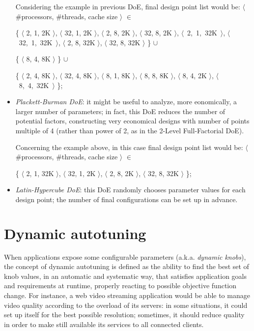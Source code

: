 \begin{itemize}
\begin{enumerate}
    \end{enumerate}
    
    Considering the example in previous DoE, final design point list would be: $\langle$ \#processors, \#threads, cache size $\rangle$ $\in$
    
    \{ $\langle$ 2, 1, 2K $\rangle$, $\langle$ 32, 1, 2K $\rangle$, $\langle$ 2, 8, 2K $\rangle$, $\langle$ 32, 8, 2K $\rangle$, \hbox{$\langle$ 2, 1, 32K $\rangle$}, \hbox{$\langle$ 32, 1, 32K $\rangle$}, $\langle$ 2, 8, 32K $\rangle$, $\langle$ 32, 8, 32K $\rangle$ \} $\cup$ 
    
    \{ $\langle$ 8, 4, 8K $\rangle$ \} $\cup$
    
    \{ $\langle$ 2, 4, 8K $\rangle$, $\langle$ 32, 4, 8K $\rangle$, $\langle$ 8, 1, 8K $\rangle$, $\langle$ 8, 8, 8K $\rangle$, $\langle$ 8, 4, 2K $\rangle$, \hbox{$\langle$ 8, 4, 32K $\rangle$} \};
    
    \item \textit{Plackett-Burman DoE}: it might be useful to analyze, more eonomically, a larger number of parameters; in fact, this DoE reduces the number of potential factors, constructing very economical designs with number of points multiple of 4 (rather than power of 2, as in the 2-Level Full-Factorial DoE).
    
    Concerning the example above, in this case final design point list would be: $\langle$ \#processors, \#threads, cache size $\rangle$ $\in$
    
    \{ $\langle$ 2, 1, 32K $\rangle$, $\langle$ 32, 1, 2K $\rangle$, $\langle$ 2, 8, 2K $\rangle$, $\langle$ 32, 8, 32K $\rangle$ \};
    
    \item \textit{Latin-Hypercube DoE}: this DoE randomly chooses parameter values for each design point; the number of final configurations can be set up in advance.

\end{itemize}





\section{Dynamic autotuning}

When applications expose some configurable parameters (a.k.a. \textit{dynamic knobs}), the concept of dynamic autotuning is defined as the ability to find the best set of knob values, in an automatic and systematic way, that satisfies application goals and requirements at runtime, properly reacting to possible objective function change. For instance, a web video streaming application would be able to manage video quality according to the overload of its servers: in some situations, it could set up itself for the best possible resolution; sometimes, it should reduce quality in order to make still available its services to all connected clients.

